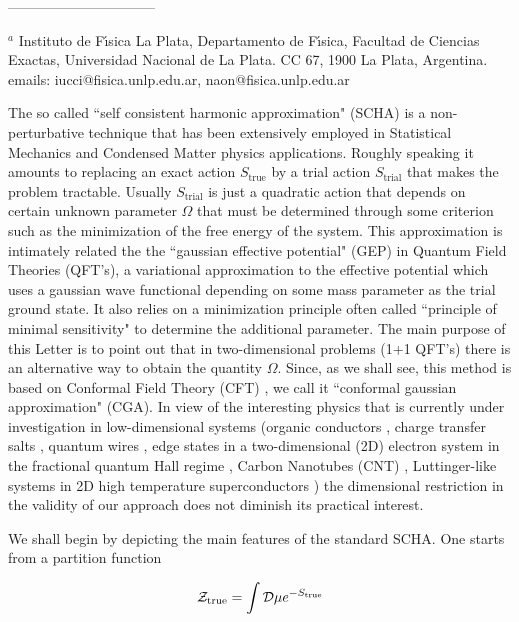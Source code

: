 \documentclass[a4paper,12pt]{article}
\begin{document}
\noindent --------------------------------


\noindent $^a$ {\footnotesize Instituto de F\'{\i}sica La Plata,
Departamento de F\'{\i}sica, Facultad de Ciencias Exactas,
Universidad Nacional de La Plata.  CC 67, 1900 La Plata,
Argentina.\\emails: iucci@fisica.unlp.edu.ar,
naon@fisica.unlp.edu.ar}


\newpage

The so called ``self consistent harmonic approximation" (SCHA) is
a non-perturbative technique that has been extensively employed in
Statistical Mechanics \cite{Saito}\cite{Fisher-Zwerger} and
Condensed Matter physics
\cite{Gogolin}\cite{Egger}\cite{Xu}\cite{Iucci} applications.
Roughly speaking it amounts to replacing an exact action
$S_{\text{true}}$ by a trial action $S_{\text{trial}}$ that makes
the problem tractable. Usually $S_{\text{trial}}$ is just a
quadratic action that depends on certain unknown parameter
$\Omega$ that must be determined through some criterion such as
the minimization of the free energy of the system. This
approximation is intimately related the the ``gaussian effective
potential" (GEP) \cite{Stevenson}\cite{Ingermanson} in Quantum
Field Theories (QFT's), a variational approximation to the
effective potential which uses a gaussian wave functional
depending on some mass parameter as the trial ground state. It
also relies on a minimization principle often called ``principle
of minimal sensitivity" \cite{minimal} to determine the additional
parameter. The main purpose of this Letter is to point out that in
two-dimensional problems (1+1 QFT's) there is an alternative way
to obtain the quantity $\Omega$. Since, as we shall see, this
method is based on Conformal Field Theory (CFT) \cite{CFT}, we
call it ``conformal gaussian approximation" (CGA). In view of the
interesting physics that is currently under investigation in
low-dimensional systems (organic conductors \cite{organic
conductors}, charge transfer salts \cite{salts}, quantum wires
\cite{quantum wires}, edge states in a two-dimensional (2D)
electron system in the fractional quantum Hall regime \cite{FQH},
Carbon Nanotubes (CNT) \cite{CNT}, Luttinger-like systems in 2D
high temperature superconductors \cite{Orgad}) the dimensional
restriction in the validity of our approach does not diminish its
practical interest.

We shall begin by depicting the main features of the standard SCHA. One starts from a
partition function

\begin{equation}
\mathcal{Z}_{\text{true}}=\int\mathcal{D}\mu e^{-S_{\text{true}}}
\end{equation}
\end{document}
